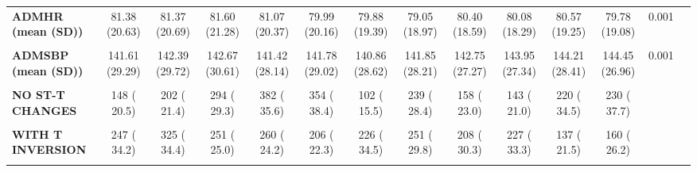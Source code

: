 \documentclass[
]{article}
\begin{document}
\begin{table}[H]
\begin{tabular}[t]{>{\raggedright\arraybackslash}p{5em}ccccccccccccc}
\textbf{ADMHR (mean (SD))} & 81.38 (20.63) & 81.37 (20.69) & 81.60 (21.28) & 81.07 (20.37) & 79.99 (20.16) & 79.88 (19.39) & 79.05 (18.97) & 80.40 (18.59) & 80.08 (18.29) & 80.57 (19.25) & 79.78 (19.08) & 0.001 & \\
\textbf{\cellcolor{gray!10}{ADMKLP (mean (SD))}} & \cellcolor{gray!10}{1.29 (0.68)} & \cellcolor{gray!10}{1.32 (0.69)} & \cellcolor{gray!10}{1.32 (0.66)} & \cellcolor{gray!10}{1.26 (0.63)} & \cellcolor{gray!10}{1.18 (0.54)} & \cellcolor{gray!10}{1.21 (0.60)} & \cellcolor{gray!10}{1.20 (0.58)} & \cellcolor{gray!10}{1.15 (0.51)} & \cellcolor{gray!10}{1.20 (0.60)} & \cellcolor{gray!10}{1.21 (0.58)} & \cellcolor{gray!10}{1.13 (0.45)} & \cellcolor{gray!10}{<0.001} & \cellcolor{gray!10}{}\\
\textbf{ADMSBP (mean (SD))} & 141.61 (29.29) & 142.39 (29.72) & 142.67 (30.61) & 141.42 (28.14) & 141.78 (29.02) & 140.86 (28.62) & 141.85 (28.21) & 142.75 (27.27) & 143.95 (27.34) & 144.21 (28.41) & 144.45 (26.96) & 0.001 & \\
\textbf{\cellcolor{gray!10}{ADMST (\%)}} & \cellcolor{gray!10}{} & \cellcolor{gray!10}{} & \cellcolor{gray!10}{} & \cellcolor{gray!10}{} & \cellcolor{gray!10}{} & \cellcolor{gray!10}{} & \cellcolor{gray!10}{} & \cellcolor{gray!10}{} & \cellcolor{gray!10}{} & \cellcolor{gray!10}{} & \cellcolor{gray!10}{} & \cellcolor{gray!10}{<0.001} & \cellcolor{gray!10}{}\\
\textbf{NO ST-T CHANGES} & 148 ( 20.5) & 202 ( 21.4) & 294 ( 29.3) & 382 ( 35.6) & 354 ( 38.4) & 102 ( 15.5) & 239 ( 28.4) & 158 ( 23.0) & 143 ( 21.0) & 220 ( 34.5) & 230 ( 37.7) &  & \\
\textbf{\cellcolor{gray!10}{WITH ST DEPRESSION}} & \cellcolor{gray!10}{327 ( 45.3)} & \cellcolor{gray!10}{418 ( 44.2)} & \cellcolor{gray!10}{458 ( 45.7)} & \cellcolor{gray!10}{431 ( 40.2)} & \cellcolor{gray!10}{362 ( 39.3)} & \cellcolor{gray!10}{328 ( 50.0)} & \cellcolor{gray!10}{351 ( 41.7)} & \cellcolor{gray!10}{320 ( 46.6)} & \cellcolor{gray!10}{312 ( 45.7)} & \cellcolor{gray!10}{281 ( 44.0)} & \cellcolor{gray!10}{220 ( 36.1)} & \cellcolor{gray!10}{} & \cellcolor{gray!10}{}\\
\textbf{WITH T INVERSION} & 247 ( 34.2) & 325 ( 34.4) & 251 ( 25.0) & 260 ( 24.2) & 206 ( 22.3) & 226 ( 34.5) & 251 ( 29.8) & 208 ( 30.3) & 227 ( 33.3) & 137 ( 21.5) & 160 ( 26.2) &  & \\
\textbf{\cellcolor{gray!10}{ADMSY1 = YES (\%)}} & \cellcolor{gray!10}{1483 ( 82.7)} & \cellcolor{gray!10}{1734 ( 84.7)} & \cellcolor{gray!10}{1138 ( 54.3)} & \cellcolor{gray!10}{1186 ( 57.2)} & \cellcolor{gray!10}{1501 ( 86.0)} & \cellcolor{gray!10}{1518 ( 85.3)} & \cellcolor{gray!10}{1702 ( 90.3)} & \cellcolor{gray!10}{1473 ( 82.2)} & \cellcolor{gray!10}{1415 ( 79.6)} & \cellcolor{gray!10}{1318 ( 75.3)} & \cellcolor{gray!10}{1282 ( 73.0)} & \cellcolor{gray!10}{<0.001} & \cellcolor{gray!10}{}\\

\end{tabular}
\end{table}
\end{document}
